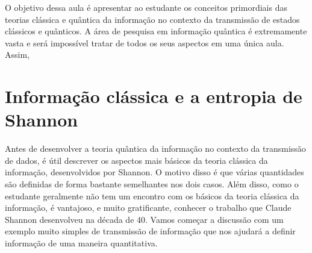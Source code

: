 \documentclass{article}
\begin{document}
O objetivo dessa aula é apresentar ao estudante os conceitos primordiais das teorias clássica e quântica da informação no contexto da transmissão de estados clássicos e quânticos. A área de pesquisa em informação quântica é extremamente vasta e será impossível tratar de todos os seus aspectos em uma única aula. Assim,  



\section{Informação clássica e a entropia de Shannon}

Antes de desenvolver a teoria quântica da informação no contexto da transmissão de dados, é útil descrever os aspectos mais básicos da teoria clássica da informação, desenvolvidos por Shannon. O motivo disso é que várias quantidades são definidas de forma bastante semelhantes nos dois casos. Além disso, como o estudante geralmente não tem um encontro com os básicos da teoria clássica da informação, é vantajoso, e muito gratificante, conhecer o trabalho que Claude Shannon desenvolveu na década de 40. Vamos começar a discussão com um exemplo muito simples de transmissão de informação que nos ajudará a definir informação de uma maneira quantitativa.
\end{document}
